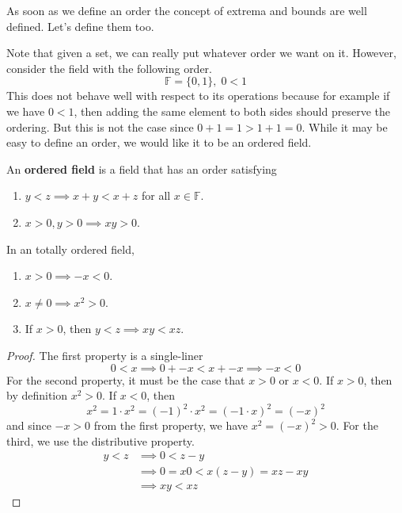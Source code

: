     As soon as we define an order the concept of extrema and bounds are well defined. Let's define them too. 

    Note that given a set, we can really put whatever order we want on it. However, consider the field with the following order. 
    \begin{equation}
      \mathbb{F} = \{0, 1\}, \; 0 < 1
    \end{equation} 
    This does not behave well with respect to its operations because for example if we have $0 < 1$, then adding the same element to both sides should preserve the ordering. But this is not the case since $0 + 1 = 1 > 1 + 1 = 0$. While it may be easy to define an order, we would like it to be an ordered field. 

    \begin{definition}
      An \textbf{ordered field} is a field that has an order satisfying 
      \begin{enumerate}
        \item $y < z \implies x + y < x + z$ for all $x \in \mathbb{F}$. 
        \item $x > 0, y > 0 \implies xy > 0$. 
      \end{enumerate}
    \end{definition}

    \begin{theorem}[Properties]
      In an totally ordered field, 
      \begin{enumerate}
        \item $x > 0 \implies -x < 0$. 
        \item $x \neq 0 \implies x^2 > 0$. 
        \item If $x > 0$, then $y < z \implies xy < xz$. 
      \end{enumerate}
    \end{theorem} 
    \begin{proof}
      The first property is a single-liner 
      \begin{equation}
        0 < x \implies 0 + -x < x + -x \implies -x < 0 
      \end{equation}
      For the second property, it must be the case that $x > 0$ or $x < 0$. If $x > 0$, then by definition $x^2 > 0$. If $x < 0$, then 
      \begin{equation}
        x^2 = 1 \cdot x^2 = (-1)^2 \cdot x^2 = (-1 \cdot x)^2 = (-x)^2
      \end{equation}
      and since $-x > 0$ from the first property, we have $x^2 = (-x)^2 > 0$. For the third, we use the distributive property. 
      \begin{align}
        y < z & \implies 0 < z - y \\ 
              & \implies 0 = x 0 < x(z - y) = xz - xy \\
              & \implies xy < xz
      \end{align}
    \end{proof}

